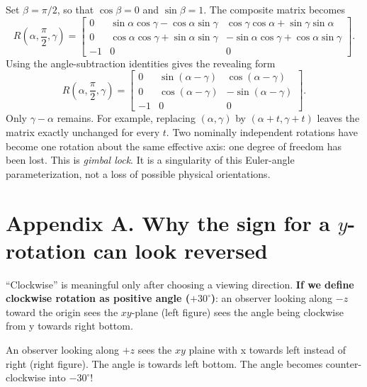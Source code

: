 \documentclass[10pt]{article}
\newcommand{\cA}{\cos\alpha}
\newcommand{\sA}{\sin\alpha}
\newcommand{\cB}{\cos\beta}
\newcommand{\sB}{\sin\beta}
\newcommand{\cG}{\cos\gamma}
\newcommand{\sG}{\sin\gamma}
\begin{document}
Set $\beta=\pi/2$, so that $\cB=0$ and $\sB=1$.  The composite matrix
becomes
\[
 R\left(\alpha,\frac\pi2,\gamma\right)=
 \begin{bmatrix}
 0&\sA\cG-\cA\sG&\cG\cA+\sG\sA\\
 0&\cA\cG+\sA\sG& -\sA\cG+\cA\sG\\
 -1&0&0
 \end{bmatrix}.
\]
Using the angle-subtraction identities gives the revealing form
\[
 \boxed{
 R\left(\alpha,\frac\pi2,\gamma\right)=
 \begin{bmatrix}
 0&\sin(\alpha-\gamma)&\cos(\alpha-\gamma)\\
 0&\cos(\alpha-\gamma)& -\sin(\alpha-\gamma)\\
 -1&0&0
 \end{bmatrix}.}
\]
Only $\gamma-\alpha$ remains.  For example, replacing
$(\alpha,\gamma)$ by $(\alpha+t,\gamma+t)$ leaves the matrix exactly
unchanged for every $t$.  Two nominally independent rotations have become
one rotation about the same effective axis: one degree of freedom has been
lost.  This is \emph{gimbal lock}.  It is a singularity of this Euler-angle
parameterization, not a loss of possible physical orientations.

\appendix
\section*{Appendix A. Why the sign for a $y$-rotation can look reversed}

``Clockwise'' is meaningful only after choosing a viewing direction. \textbf{If we define clockwise rotation as positive angle ($+30^\circ$)}: an
observer looking along $-z$ toward the origin sees the $xy$-plane (left figure) sees the angle being clockwise from y towards right bottom.

An observer looking along $+z$ sees the $xy$ plaine with x towards left instead of right (right figure). The angle is towards left bottom. The angle becomes counter-clockwise into $-30^\circ$!
\end{document}
